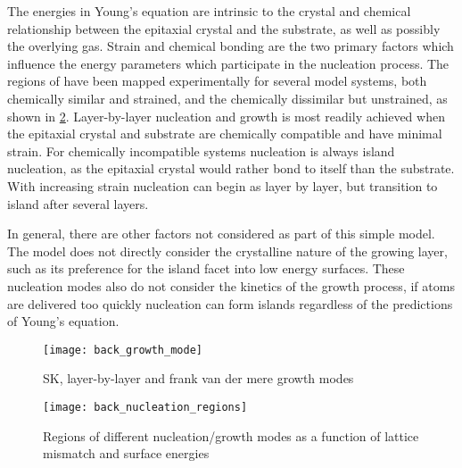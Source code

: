 The energies in Young's equation are intrinsic to the crystal and chemical relationship between the epitaxial crystal and the substrate, as well as possibly the overlying gas. Strain and chemical bonding are the two primary factors which influence the energy parameters which participate in the nucleation process. The regions of have been mapped experimentally for several model systems, both chemically similar and strained, and the chemically dissimilar but unstrained, as shown in \cref{fig:back_nucleation_regions}. Layer-by-layer nucleation and growth is most readily achieved when the epitaxial crystal and substrate are chemically compatible and have minimal strain. For chemically incompatible systems nucleation is always island nucleation, as the epitaxial crystal would rather bond to itself than the substrate. With increasing strain nucleation can begin as layer by layer, but transition to island after several layers.

 In general, there are other factors not considered as part of this simple model. The model does not directly consider the crystalline nature of the growing layer, such as its preference for the island facet into low energy surfaces. These nucleation modes also do not consider the kinetics of the growth process, if atoms are delivered too quickly nucleation can form islands regardless of the predictions of Young's equation.
\begin{figure}
    \centering
    \texttt{[image: back\_growth\_mode]}
    \caption[Growth modes of thin films]{\label{fig:back_growth_mode}SK, layer-by-layer and frank van der mere growth modes\cite{ohring2001materials}}
\end{figure}

\begin{figure}
    \centering
    \texttt{[image: back\_nucleation\_regions]}
    \caption[Nucleation phase diagram of surface energy and strain]{\label{fig:back_nucleation_regions}Regions of different nucleation/growth modes as a function of lattice mismatch and surface energies\cite{ohring2001materials}}
\end{figure}

